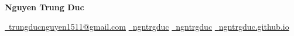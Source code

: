 \documentclass[letterpaper,11pt]{article}
\begin{document}
\begin{center}
    {\Huge \textbf{Nguyen Trung Duc}} \\
    \vspace{0.7em}

    \href{mailto:trungducnguyen1511@gmail.com}{\faEnvelope\ trungducnguyen1511@gmail.com} \quad 
    \href{https://www.linkedin.com/in/ngntrgduc/}{\faLinkedin\ {ngntrgduc}} \quad
    \href{https://github.com/ngntrgduc}{\faGithub\ {ngntrgduc}} \quad
    \href{https://ngntrgduc.github.io/}{\faHome\ {ngntrgduc.github.io}} 
\end{center}


\end{document}
